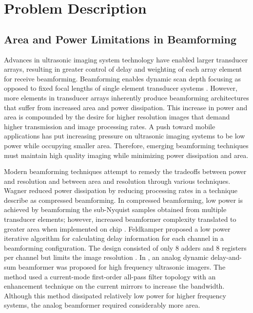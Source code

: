 \documentclass[journal]{IEEEtran}
\begin{document}
\section{Problem Description}

\subsection{Area and Power Limitations in Beamforming}

Advances in ultrasonic imaging system technology have enabled larger transducer arrays, resulting in greater control of delay and weighting of each array element for receive beamforming. Beamforming enables dynamic scan depth focusing as opposed to fixed focal lengths of single element transducer systems \cite{Szabo}. However, more elements in transducer arrays inherently produce beamforming architectures that suffer from increased area and power dissipation. This increase in power and area is compounded by the desire for higher resolution images that demand higher transmission and image processing rates. A push toward mobile applications has put increasing pressure on ultrasonic imaging systems to be low power while occupying smaller area. Therefore, emerging beamforming techniques must maintain high quality imaging while minimizing power dissipation and area. 

Modern beamforming techniques attempt to remedy the tradeoffs between power and resolution and between area and resolution through various techniques. Wagner reduced power dissipation by reducing processing rates in a technique describe as compressed beamforming. In compressed beamforming, low power is achieved by beamforming the sub-Nyquist samples obtained from multiple transducer elements; however, increased beamformer complexity translated to greater area when implemented on chip \cite{Wagner}. Feldkamper proposed a low power iterative algorithm for calculating delay information for each channel in a beamforming configuration. The design consisted of only 8 adders and 8 registers per channel but limits the image resolution \cite{feldkamper2000low}. In \cite{gurun2012analog}, an analog dynamic delay-and-sum beamformer was proposed for high frequency ultrasonic imagers. The method used a current-mode first-order all-pass filter topology with an enhancement technique on the current mirrors to increase the bandwidth. Although this method dissipated relatively low power for higher frequency systems, the analog beamformer required considerably more area. 
\end{document}
